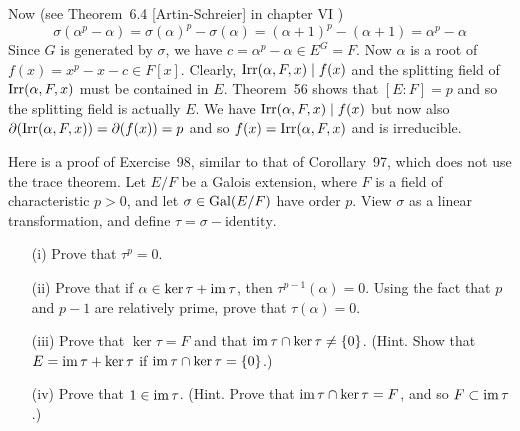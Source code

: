 \begin{myenumerate}
\begin{itemize}
   Now (see Theorem~6.4 [Artin-Schreier] in chapter \textsf{VI} \cite{Lang94})
   \begin{equation*}
    \sigma(\alpha^p - \alpha) = \sigma(\alpha)^p - \sigma(\alpha) =
     (\alpha+1)^p - (\alpha+1) = \alpha^p - \alpha
   \end{equation*}
   Since $G$ is generated by \(\sigma\),
   we have \(c = \alpha^p - \alpha \in E^G = F\).
   Now \(\alpha\) is a root of \(f(x) = x^p - x - c \in F[x]\).
   Clearly, \(\mathop{\rm Irr}\nolimits(\alpha,F,x) \mid f(x)\) and the splitting field
   of \(\mathop{\rm Irr}\nolimits(\alpha,F,x)\) must be contained in $E$.
   Theorem~56 \cite{Rotman98} shows that \([E:F]=p\) and so
   the splitting field is actually $E$.
   We have  \(\mathop{\rm Irr}\nolimits(\alpha,F,x) \mid f(x)\) but now also
   \(\partial(\mathop{\rm Irr}\nolimits(\alpha,F,x)) = \partial(f(x)) = p\) and
   so \(f(x) = \mathop{\rm Irr}\nolimits(\alpha,F,x)\)  and is irreducible.
\end{itemize}

\item
\begin{excopy}
Here
\label{ex:notrace}
is a proof of Exercise~98, similar to that of Corollary~97, which
does not use the trace theorem.  Let \(E/F\) be a Galois extension,
where $F$ is a field of characteristic \(p>0\), and let
\(\sigma \in \mathop{\rm Gal}\nolimits(E/F)\) have order $p$. View \(\sigma\) as a linear
transformation, and define \(\tau = \sigma - \textrm{identity}\).
\begin{itemize}
 \item[(i)] Prove that \(\tau^p = 0\).

 \item[(ii)]
   Prove that if \(\alpha \in \mathop{\rm ker}\nolimits \tau + \mathop{\rm im}\nolimits \tau\), then
   \(\tau^{p-1}(\alpha) = 0\).  Using the fact that $p$ and \(p-1\)
   are relatively prime, prove that \(\tau(\alpha) = 0\).

 \item[(iii)]
   Prove that \(\ker \tau = F\) and that \(\mathop{\rm im}\nolimits \tau \cap \mathop{\rm ker}\nolimits \tau
   \neq \{0\}\).  (Hint. Show that \(E = \mathop{\rm im}\nolimits\tau + \mathop{\rm ker}\nolimits\tau\) if
   \(\mathop{\rm im}\nolimits\tau \cap \mathop{\rm ker}\nolimits\tau = \{0\}\).)

 \item[(iv)]
   Prove that \(1\in \mathop{\rm im}\nolimits\tau\).  (Hint. Prove that
   \(\mathop{\rm im}\nolimits\tau \cap \mathop{\rm ker}\nolimits\tau = F\), and so \(F\subset \mathop{\rm im}\nolimits\tau\).)
\end{itemize}
\end{excopy}

\begin{itemize}


\end{itemize}
\end{myenumerate}
